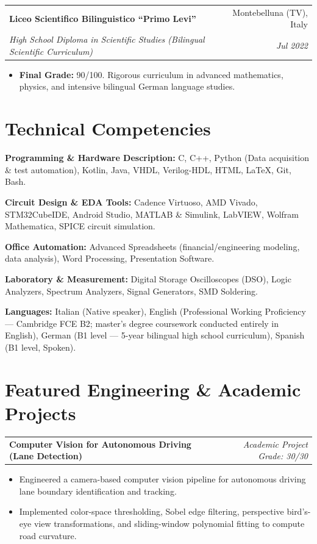 \documentclass[10pt,a4paper]{article}
\makeatletter
\newcommand{\resumeItem}[1]{%
  \item\small{#1}%
}
\newcommand{\resumeSubheading}[4]{%
  \vspace{1.5pt}
  \noindent\begin{tabular*}{\textwidth}[t]{@{}l@{\extracolsep{\fill}}r@{}}
    \textbf{#1} & \textcolor{secondary}{\small #2} \\
    \textit{\small #3} & \textcolor{secondary}{\textit{\small #4}} \\
  \end{tabular*}\vspace{-2pt}
}
\newcommand{\resumeProjectHeading}[2]{%
  \vspace{1.5pt}
  \noindent\begin{tabular*}{\textwidth}[t]{@{}l@{\extracolsep{\fill}}r@{}}
    \textbf{#1} & \textcolor{secondary}{\textit{\small #2}} \\
  \end{tabular*}\vspace{-2pt}
}
\newcommand{\resumeItemListStart}{\begin{itemize}[leftmargin=1.15em, itemsep=2.2pt, topsep=1.5pt, parsep=0pt]}
\newcommand{\resumeItemListEnd}{\end{itemize}\vspace{2pt}}
\makeatother
\begin{document}
\resumeSubheading
  {Liceo Scientifico Bilinguistico ``Primo Levi''}{Montebelluna (TV), Italy}
  {High School Diploma in Scientific Studies (Bilingual Scientific Curriculum)}{Jul 2022}
  \resumeItemListStart
    \resumeItem{\textbf{Final Grade:} 90/100. Rigorous curriculum in advanced mathematics, physics, and intensive bilingual German language studies.}
  \resumeItemListEnd

\section{Technical Competencies}
\begin{itemize}[leftmargin=1.15em, itemsep=2.2pt, topsep=1.5pt, parsep=0pt]
    \small{
    \item{\textbf{Programming \& Hardware Description:} C, C++, Python (Data acquisition \& test automation), Kotlin, Java, VHDL, Verilog-HDL, HTML, LaTeX, Git, Bash.}
    \item{\textbf{Circuit Design \& EDA Tools:} Cadence Virtuoso, AMD Vivado, STM32CubeIDE, Android Studio, MATLAB \& Simulink, LabVIEW, Wolfram Mathematica, SPICE circuit simulation.}
    \item{\textbf{Office Automation:} Advanced Spreadsheets (financial/engineering modeling, data analysis), Word Processing, Presentation Software.}
    \item{\textbf{Laboratory \& Measurement:} Digital Storage Oscilloscopes (DSO), Logic Analyzers, Spectrum Analyzers, Signal Generators, SMD Soldering.}
    \item{\textbf{Languages:} Italian (Native speaker), English (Professional Working Proficiency --- Cambridge FCE B2; master's degree coursework conducted entirely in English), German (B1 level --- 5-year bilingual high school curriculum), Spanish (B1 level, Spoken).}
    }
\end{itemize}

\newpage %

\section{Featured Engineering \& Academic Projects}

\resumeProjectHeading
  {\textbf{Computer Vision for Autonomous Driving (Lane Detection)} \ \textbar\ \ \normalfont{\textit{Python, OpenCV, Image Processing}}}{Academic Project \ \textbullet\ \ Grade: 30/30}
  \resumeItemListStart
    \resumeItem{Engineered a camera-based computer vision pipeline for autonomous driving lane boundary identification and tracking.}
    \resumeItem{Implemented color-space thresholding, Sobel edge filtering, perspective bird's-eye view transformations, and sliding-window polynomial fitting to compute road curvature.}
  \resumeItemListEnd
\end{document}
